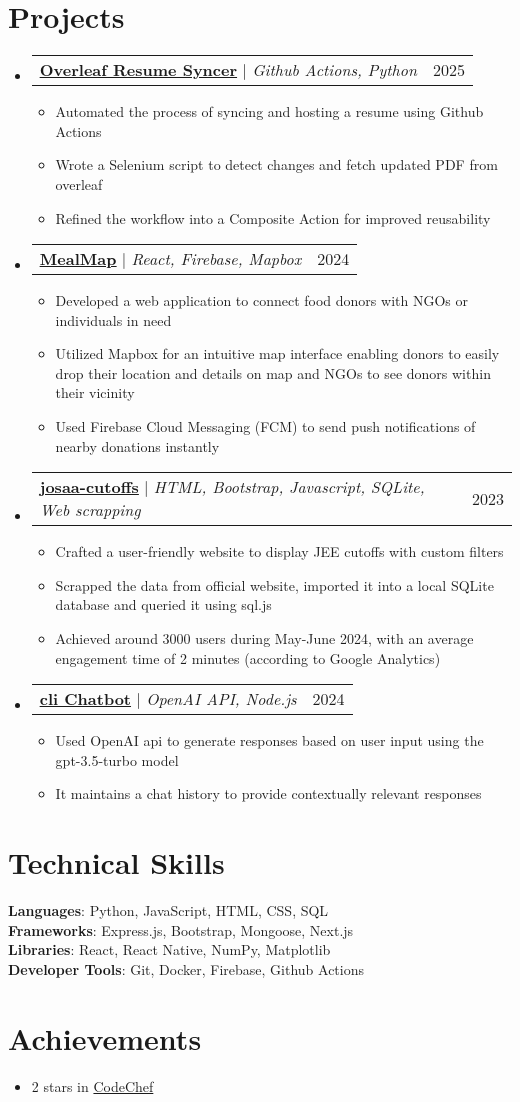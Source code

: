 \documentclass[letterpaper,11pt]{article}
\makeatletter
\newcommand{\resumeItem}[1]{
\item\small{
{#1 \vspace{-5pt}}
}
}
\newcommand{\resumeProjectHeading}[2]{
\item
\begin{tabular*}{0.97\textwidth}{l@{\extracolsep{\fill}}r}
\small#1 & #2 \\
\end{tabular*}\vspace{0pt}
}
\newcommand{\resumeSubHeadingListStart}{\begin{itemize}[leftmargin=0.15in, label={}]}
\newcommand{\resumeSubHeadingListEnd}{\end{itemize}}
\newcommand{\resumeItemListStart}{\begin{itemize}}
\newcommand{\resumeItemListEnd}{\end{itemize}\vspace{3pt}}
\makeatother
\begin{document}
\section{Projects}
\resumeSubHeadingListStart
\resumeProjectHeading
{\textbf{\href{https://github.com/Sbrjt/overleaf-resume-downloader}{\href{}{\underline{Overleaf Resume Syncer}}}} $|$ \emph{Github Actions, Python}}{2025}
\resumeItemListStart
\resumeItem{Automated the process of syncing and hosting a resume using Github Actions}
\resumeItem{Wrote a Selenium script to detect changes and fetch updated PDF from overleaf}
\resumeItem{Refined the workflow into a Composite Action for improved reusability}
\resumeItemListEnd
\resumeProjectHeading
{\textbf{\href{https://github.com/Sbrjt/MealMap}{\href{}{\underline{MealMap}}}} $|$ \emph{React, Firebase, Mapbox}}{2024}
\resumeItemListStart
\resumeItem{Developed a web application to connect food donors with NGOs or individuals in need}
\resumeItem{Utilized Mapbox for an intuitive map interface enabling donors to easily drop their location and details on map and NGOs to see donors within their vicinity}
\resumeItem{Used Firebase Cloud Messaging (FCM) to send push notifications of nearby donations instantly}
\resumeItemListEnd
\resumeProjectHeading
{\textbf{\href{https://github.com/Sbrjt/josaa-cutoffs}{\href{}{\underline{josaa-cutoffs}}}} $|$ \emph{HTML, Bootstrap, Javascript, SQLite, Web scrapping}}{2023}
\resumeItemListStart
\resumeItem{Crafted a user-friendly website to display JEE cutoffs with custom filters}
\resumeItem{Scrapped the data from official website, imported it into a local SQLite database and queried it using sql.js}
\resumeItem{Achieved around 3000 users during May-June 2024, with an average engagement time of 2 minutes (according to Google Analytics)}
\resumeItemListEnd
\resumeProjectHeading
{\textbf{\href{https://github.com/Sbrjt/Chatbot}{\href{}{\underline{cli Chatbot}}}} $|$ \emph{OpenAI API, Node.js}}{2024}
\resumeItemListStart
\resumeItem{Used OpenAI api to generate responses based on user input using the gpt-3.5-turbo model}
\resumeItem{It maintains a chat history to provide contextually relevant responses}
\resumeItemListEnd
\resumeSubHeadingListEnd



%
\section{Technical Skills}
\begin{itemize}[leftmargin=0.15in, label={}]
\small{\item{
\textbf{Languages}{: Python, JavaScript, HTML, CSS, SQL} \\
\textbf{Frameworks}{: Express.js, Bootstrap, Mongoose, Next.js} \\
\textbf{Libraries}{: React, React Native, NumPy, Matplotlib} \\
\textbf{Developer Tools}{: Git, Docker, Firebase, Github Actions }
}}
\end{itemize}


\section{Achievements}
\begin{itemize}[leftmargin=0.15in]
\item \small{2 stars in \href{https://www.codechef.com/users/sbrjt}{CodeChef}}
\end{itemize}


\end{document}
